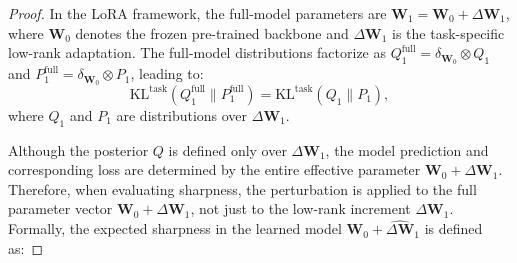 \documentclass[letterpaper]{article} %
\begin{document}
\begin{proof}
In the LoRA framework, the full-model parameters are $\boldsymbol{W}_1 = \boldsymbol{W}_0 + \Delta\boldsymbol{W}_1$, where $\boldsymbol{W}_0$ denotes the frozen pre-trained backbone and $\Delta\boldsymbol{W}_1$ is the task-specific low-rank adaptation. The full-model distributions factorize as $Q_1^{\text{full}} = \delta_{\boldsymbol{W}_0} \otimes Q_1$ and $P_1^{\text{full}} = \delta_{\boldsymbol{W}_0} \otimes P_1$, leading to:
\begin{equation}
    \text{KL}^{\text{task}}(Q_1^{\text{full}} \| P_1^{\text{full}}) = \text{KL}^{\text{task}}(Q_1 \| P_1),
\end{equation}
where $Q_1$ and $P_1$ are distributions over $\Delta\boldsymbol{W}_1$. 


Although the posterior $Q$ is defined only over $\Delta\boldsymbol{W}_1$, the model prediction and corresponding loss are determined by the entire effective parameter $\boldsymbol{W}_0 + \Delta\boldsymbol{W}_1$. Therefore, when evaluating sharpness, the perturbation is applied to the full parameter vector $\boldsymbol{W}_0 + \Delta\boldsymbol{W}_1$, not just to the low-rank increment $\Delta\boldsymbol{W}_1$. Formally, the expected sharpness in the learned model $\boldsymbol{W}_0 + \hat{\Delta\boldsymbol{W}}_1$ is defined as:


\end{proof}
\end{document}
